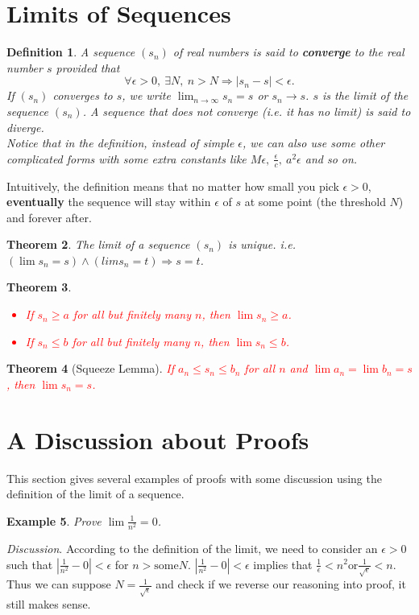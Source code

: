 \documentclass[12pt, lettersize]{book}
\newtheorem{thm}{Theorem}[section]
\newtheorem{dfn}[thm]{Definition}
\newtheorem{eg}[thm]{Example}
\begin{document}
	\section{Limits of Sequences}		
	\begin{dfn}\label{def:limit}
		A sequence $(s_n)$ of real numbers is said to \textbf{converge} to the real number \emph{$s$} provided that
		\begin{displaymath}
			\forall \epsilon > 0,\ \exists N,\ n > N \Rightarrow |s_n-s| < \epsilon.
		\end{displaymath}
		If $(s_n)$ converges to $s$, we write $\lim_{n\rightarrow \infty}s_n=s$ or $s_n\rightarrow s$. $s$ is the \emph{limit} of the sequence $(s_n)$.
		A sequence that does not converge (i.e. it has no \emph{limit}) is said to \emph{diverge}.\\
		Notice that in the definition, instead of simple $\epsilon$, we can also use some other complicated forms with some extra constants like $M\epsilon,\ \frac{\epsilon}{c},\ a^2\epsilon$ and so on.
	\end{dfn}
	
	Intuitively, the definition means that no matter how small you pick $\epsilon>0$, \textbf{eventually} the sequence will stay within $\epsilon$ of $s$ at some point (the threshold $N$) and forever after.
	
	\begin{thm}
		The limit of a sequence $(s_n)$ is unique. i.e. $(\lim s_n=s) \land (lim s_n=t) \Rightarrow s=t$.
	\end{thm}
	
	\begin{thm}
		\textcolor{red}{
			\begin{itemize}
				\item If $s_n\geq a$ for all but finitely many $n$, then $\lim s_n\geq a$.
				\item If $s_n\leq b$ for all but finitely many $n$, then $\lim s_n\leq b$.
		\end{itemize}}
	\end{thm}
	
	\begin{thm}[Squeeze Lemma]\label{lem: squeeze}
		\textcolor{red}{If $a_n\leq s_n\leq b_n$ for all $n$ and $\lim a_n=\lim b_n=s$, then $\lim s_n=s$.}
	\end{thm}
	
	\newpage
	
	\section{A Discussion about Proofs}
	This section gives several examples of proofs with some discussion using the definition of the limit of a sequence.
	\begin{eg}
		Prove $\lim \frac{1}{n^2}=0$.
	\end{eg}
	\emph{Discussion}. According to the definition of the limit, we need to consider an $\epsilon >0$ such that $|\frac{1}{n^2}-0|<\epsilon$ for $n>\text{some}N$.
	$|\frac{1}{n^2}-0|<\epsilon$ implies that $\frac{1}{\epsilon}<n^2 \text{or} \frac{1}{\sqrt{\epsilon}}<n$.
	Thus we can suppose $N=\frac{1}{\sqrt{\epsilon}}$ and check if we reverse our reasoning into proof, it still makes sense. 
	
\end{document}
